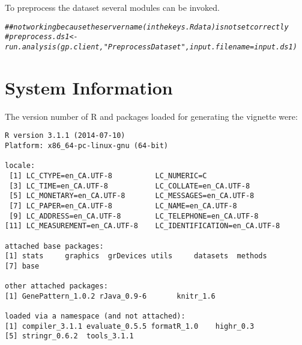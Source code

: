 \documentclass[9pt,english]{extarticle}\usepackage[]{graphicx}\usepackage[]{color}
\makeatletter
\newcommand{\hlcom}[1]{\textcolor[rgb]{0.678,0.584,0.686}{\textit{#1}}}%
\newenvironment{kframe}{%
 \def\at@end@of@kframe{}%
 \ifinner\ifhmode%
  \def\at@end@of@kframe{\end{minipage}}%
  \begin{minipage}{\columnwidth}%
 \fi\fi%
 \def\FrameCommand##1{\hskip\@totalleftmargin \hskip-\fboxsep
 \colorbox{shadecolor}{##1}\hskip-\fboxsep
     \hskip-\linewidth \hskip-\@totalleftmargin \hskip\columnwidth}%
 \MakeFramed {\advance\hsize-\width
   \@totalleftmargin\z@ \linewidth\hsize
   \@setminipage}}%
 {\par\unskip\endMakeFramed%
 \at@end@of@kframe}
\newenvironment{knitrout}{}{} %
\makeatother
\begin{document}
\begin{linenumbers}
To preprocess the dataset several modules can be invoked.
\begin{knitrout}
\color{fgcolor}\begin{kframe}
\begin{alltt}
\hlcom{## not working because the servername (in the keys.Rdata) is not set correctly}
\hlcom{#preprocess.ds1 <- run.analysis(gp.client, "PreprocessDataset", input.filename=input.ds1)}
\end{alltt}
\end{kframe}
\end{knitrout}


\section{System Information}
\label{sec:sys_info}
\noindent
The version number of R and packages loaded for generating the vignette were:
\begin{knitrout}
\color{fgcolor}\begin{kframe}
\begin{verbatim}
R version 3.1.1 (2014-07-10)
Platform: x86_64-pc-linux-gnu (64-bit)

locale:
 [1] LC_CTYPE=en_CA.UTF-8          LC_NUMERIC=C                 
 [3] LC_TIME=en_CA.UTF-8           LC_COLLATE=en_CA.UTF-8       
 [5] LC_MONETARY=en_CA.UTF-8       LC_MESSAGES=en_CA.UTF-8      
 [7] LC_PAPER=en_CA.UTF-8          LC_NAME=en_CA.UTF-8          
 [9] LC_ADDRESS=en_CA.UTF-8        LC_TELEPHONE=en_CA.UTF-8     
[11] LC_MEASUREMENT=en_CA.UTF-8    LC_IDENTIFICATION=en_CA.UTF-8

attached base packages:
[1] stats     graphics  grDevices utils     datasets  methods  
[7] base     

other attached packages:
[1] GenePattern_1.0.2 rJava_0.9-6       knitr_1.6        

loaded via a namespace (and not attached):
[1] compiler_3.1.1 evaluate_0.5.5 formatR_1.0    highr_0.3     
[5] stringr_0.6.2  tools_3.1.1   
\end{verbatim}
\end{kframe}
\end{knitrout}



\end{linenumbers}
\end{document}
